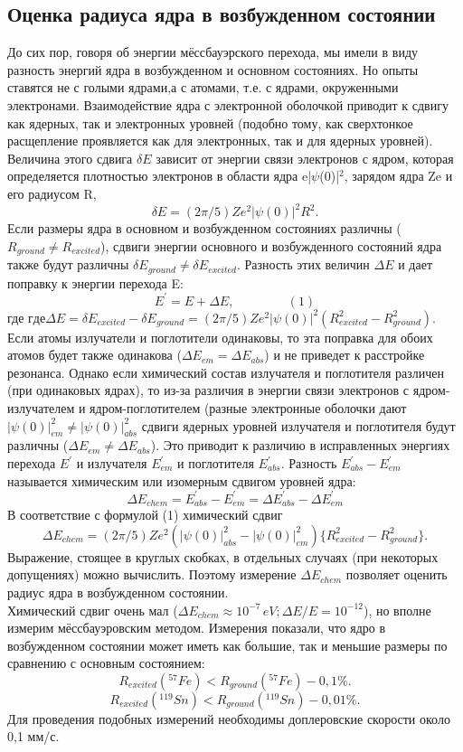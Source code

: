 \documentclass{article}
\begin{document}
\subsection{Оценка радиуса ядра в возбужденном состоянии}
\hspace{12pt} До сих пор, говоря об энергии мёссбауэрского перехода, мы имели в виду разность энергий ядра в возбужденном и основном состояниях. Но опыты ставятся не с голыми ядрами,а с атомами, т.е. с ядрами, окруженными электронами. Взаимодействие ядра с электронной оболочкой приводит к сдвигу как ядерных, так и электронных уровней (подобно тому, как сверхтонкое расщепление проявляется как для электронных, так и для ядерных уровней). Величина этого сдвига $\delta E$ зависит от энергии связи электронов с ядром, которая определяется плотностью электронов в области ядра e|$\psi$(0)|$^2$, зарядом ядра Ze и его радиусом R, 
$$ \delta E = (2\pi/5)Ze^2|\psi(0)|^2R^2.$$
\indent Если размеры ядра в основном и возбужденном состояниях различны ($R_{ground} \neq R_{excited}$), сдвиги энергии основного и возбужденного состояний ядра также будут различны $\delta E_{ground} \neq \delta E_{excited}$. Разность этих величин $\Delta E$ и дает поправку к энергии перехода E:
$$ E^{\prime} = E + \Delta E , \hspace{50pt} (1)$$
где ${где} \Delta E = \delta E_{excited} - \delta E_{ground} = (2\pi/5)Ze^2|\psi(0)|^2(R^2_{excited} - R^2_{ground}).$
\\
\indent Если атомы излучатели и поглотители одинаковы, то эта поправка для обоих атомов будет также одинакова ($\Delta E_{em} = \Delta E_{abs}$) и не приведет к расстройке резонанса. Однако если химический состав излучателя и поглотителя различен (при одинаковых ядрах), то из-за различия в энергии связи электронов с ядром-излучателем и ядром-поглотителем (разные электронные оболочки дают $|\psi(0)|^2_{em} \neq |\psi(0)|^2_{abs}$ сдвиги ядерных уровней излучателя и поглотителя будут различны ($\Delta E_{em} \neq \Delta E_{abs}$). Это приводит к различию в исправленных энергиях перехода $E^{\prime}$ и излучателя $E^{\prime}_{em}$ и поглотителя $E^{\prime}_{abs}$. Разность $E^{\prime}_{abs} - E^{\prime}_{em}$ называется химическим или изомерным сдвигом уровней ядра: 
$$ \Delta E_{chem} = E^{\prime}_{abs} - E^{\prime}_{em} = \Delta E^{\prime}_{abs} - \Delta E^{\prime}_{em} $$
\indent В соответствие с формулой (1) химический сдвиг
$$ \Delta E_{chem} = (2\pi/5)Ze^2(|\psi(0)|^2_{abs} - |\psi(0)|^2_{em})\{R^2_{excited} - R^2_{ground}\}.$$
\indent Выражение, стоящее в круглых скобках, в отдельных случаях (при некоторых допущениях) можно вычислить. Поэтому измерение $\Delta E_{chem}$ позволяет оценить радиус ядра в возбужденном состоянии.
\\
\indent Химический сдвиг очень мал ($\Delta E_{chem} \approx 10^{-7} \hspace{2pt} eV; \Delta E/E = 10^{-12}$), но вполне измерим мёссбауэровским методом. Измерения показали, что ядро в возбужденном состоянии может иметь как большие, так и меньшие размеры по сравнению с основным состоянием:
$$ R_{excited}(^{57}Fe) < R_{ground}(^{57}Fe) - 0,1\%.$$
$$ R_{excited}(^{119}Sn) < R_{ground}(^{119}Sn) - 0,01\%.$$
\indent Для проведения подобных измерений необходимы доплеровские скорости около 0,1 мм/с.
\end{document}
